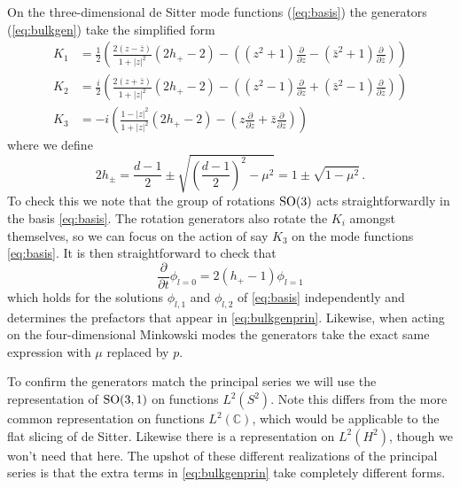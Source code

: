 \documentclass{brownthesis}
\begin{document}
On the three-dimensional de Sitter mode functions (\ref{eq:basis})
the generators (\ref{eq:bulkgen}) take the simplified form
\begin{align}
K_{1} & =\frac{1}{2}\left(\frac{2(z-\bar{z})}{1+|z|^{2}}\left(2h_{+}-2\right)-\left(\left(z^{2}+1\right)\frac{\partial}{\partial z}-\left(\bar{z}^{2}+1\right)\frac{\partial}{\partial\bar{z}}\right)\right)\nonumber \\
K_{2} & =\frac{i}{2}\left(\frac{2(z+\bar{z})}{1+|z|^{2}}\left(2h_{+}-2\right)-\left(\left(z^{2}-1\right)\frac{\partial}{\partial z}+\left(\bar{z}^{2}-1\right)\frac{\partial}{\partial\bar{z}}\right)\right)\nonumber \\
K_{3} & =-i\left(\frac{1-|z|^{2}}{1+|z|^{2}}\left(2h_{+}-2\right)-\left(z\frac{\partial}{\partial z}+\bar{z}\frac{\partial}{\partial\bar{z}}\right)\right)\label{eq:bulkgenprin}
\end{align}
where we define
\[
2h_{\pm}=\frac{d-1}{2}\pm\sqrt{\left(\frac{d-1}{2}\right)^{2}-\mu^{2}}=1\pm\sqrt{1-\mu^{2}}\,.
\]
To check this we note that the group of rotations ${\rm SO(3)}$ acts
straightforwardly in the basis \eqref{eq:basis}. The rotation generators
also rotate the $K_{i}$ amongst themselves, so we can focus on the
action of say $K_{3}$ on the mode functions \eqref{eq:basis}. It
is then straightforward to check that
\[
\frac{\partial}{\partial t}\phi_{l=0}=2(h_{+}-1)\phi_{l=1}
\]
which holds for the solutions $\phi_{l,1}$ and $\phi_{l,2}$ of \eqref{eq:basis}
independently and determines the prefactors that appear in \eqref{eq:bulkgenprin}.
Likewise, when acting on the four-dimensional Minkowski modes the
generators take the exact same expression with $\mu$ replaced by
$p$.

To confirm the generators match the principal series we will use the
representation of ${\rm SO(3,1)}$ on functions $L^{2}(S^{2})$. Note
this differs from the more common representation on functions $L^{2}(\mathbb{C})$,
which would be applicable to the flat slicing of de Sitter. Likewise
there is a representation on $L^{2}(H^{2})$, though we won't need
that here. The upshot of these different realizations of the principal
series is that the extra terms in \eqref{eq:bulkgenprin} take completely
different forms.
\end{document}
